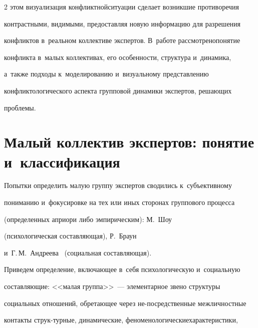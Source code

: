 \begin{multicols}{2}
этом визуализация конфликтной\linebreak си\-туации сделает возникшие противоречия 

контрастными, видимыми, предоставляя новую информацию для разрешения 

конфликтов в~реальном коллективе экспертов. В~работе рассмотрено\linebreak понятие 

конфликта в~малых коллективах, его особенности, структура и~динамика, 

а~также подходы к~моделированию и~визуальному представлению 

конфликтологического аспекта групповой динамики экспертов, решающих 

проблемы. 



\vspace*{-6pt}

  

\section{Малый коллектив экспертов: понятие и~классификация}



\vspace*{-2pt}

  

  Попытки определить малую группу экспертов сводились к~субъективному 

пониманию и~фокусировке на тех или иных сторонах группового процесса 

(определенных априори либо эмпирическим): М.~Шоу~\cite{4-r} 

(психологическая со\-став\-ля\-ющая), Р.~Браун~\cite{5-r} 

и~Г.\,М.~Андреева~\cite{6-r} (социальная составляющая). 

  

  Приведем определение, включающее в~себя психологическую и~социальную 

составляющие: <<малая группа>>~--- элементарное звено структуры 

социальных отношений, обретающее через не-\linebreak посредственные межличностные 

контакты струк-\linebreak турные, динамические, феноменологические\linebreak характеристики, 


\end{multicols}
